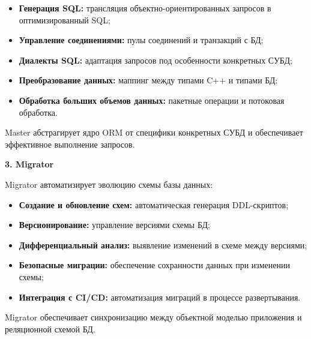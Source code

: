             \begin{itemize}
                \item \textbf{Генерация SQL:} трансляция объектно-ориентированных запросов в оптимизированный SQL;
                
                \item \textbf{Управление соединениями:} пулы соединений и транзакций с БД;
                
                \item \textbf{Диалекты SQL:} адаптация запросов под особенности конкретных СУБД;
                
                \item \textbf{Преобразование данных:} маппинг между типами C++ и типами БД;
                
                \item \textbf{Обработка больших объемов данных:} пакетные операции и потоковая обработка.
            \end{itemize}
            
            Master абстрагирует ядро ORM от специфики конкретных СУБД и обеспечивает эффективное выполнение запросов.
        
        \textbf{3. Migrator}
        
            Migrator автоматизирует эволюцию схемы базы данных:
            
            \begin{itemize}
                \item \textbf{Создание и обновление схем:} автоматическая генерация DDL-скриптов;
                
                \item \textbf{Версионирование:} управление версиями схемы БД;
                
                \item \textbf{Дифференциальный анализ:} выявление изменений в схеме между версиями;
                
                \item \textbf{Безопасные миграции:} обеспечение сохранности данных при изменении схемы;
                
                \item \textbf{Интеграция с CI/CD:} автоматизация миграций в процессе развертывания.
            \end{itemize}
            
            Migrator обеспечивает синхронизацию между объектной моделью приложения и реляционной схемой БД.

